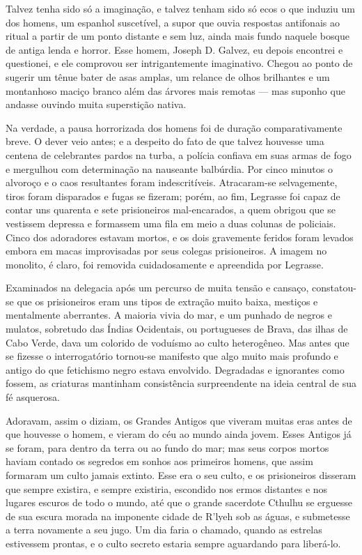 \begin{pages}
\begin{Rightside}
Talvez tenha sido só a imaginação, e talvez tenham sido só ecos o que
induziu um dos homens, um espanhol suscetível, a supor que ouvia
respostas antifonais ao ritual a partir de um ponto distante e sem luz,
ainda mais fundo naquele bosque de antiga lenda e horror. Esse homem,
Joseph D. Galvez, eu depois encontrei e questionei, e ele comprovou ser
intrigantemente imaginativo. Chegou ao ponto de sugerir um tênue bater
de asas amplas, um relance de olhos brilhantes e um montanhoso maciço
branco além das árvores mais remotas --- mas suponho que andasse ouvindo
muita superstição nativa.

Na verdade, a pausa horrorizada dos homens foi de duração
comparativamente breve. O dever veio antes; e a despeito do fato de que
talvez houvesse uma centena de celebrantes pardos na turba, a polícia
confiava em suas armas de fogo e mergulhou com determinação na nauseante
balbúrdia. Por cinco minutos o alvoroço e o caos resultantes foram
indescritíveis. Atracaram-se selvagemente, tiros foram disparados e
fugas se fizeram; porém, ao fim, Legrasse foi capaz de contar uns
quarenta e sete prisioneiros mal-encarados, a quem obrigou que se
vestissem depressa e formassem uma fila em meio a duas colunas de
policiais. Cinco dos adoradores estavam mortos, e os dois gravemente
feridos foram levados embora em macas improvisadas por seus colegas
prisioneiros. A imagem no monolito, é claro, foi removida cuidadosamente
e apreendida por Legrasse.

Examinados na delegacia após um percurso de muita tensão e cansaço,
constatou-se que os prisioneiros eram uns tipos de extração muito baixa,
mestiços e mentalmente aberrantes. A maioria vivia do mar, e um punhado
de negros e mulatos, sobretudo das Índias Ocidentais, ou portugueses de
Brava, das ilhas de Cabo Verde, dava um colorido de voduísmo ao culto
heterogêneo. Mas antes que se fizesse o interrogatório tornou-se
manifesto que algo muito mais profundo e antigo do que fetichismo negro
estava envolvido. Degradadas e ignorantes como fossem, as criaturas
mantinham consistência surpreendente na ideia central de sua fé
asquerosa.

Adoravam, assim o diziam, os Grandes Antigos que viveram muitas eras
antes de que houvesse o homem, e vieram do céu ao mundo ainda jovem.
Esses Antigos já se foram, para dentro da terra ou ao fundo do mar; mas
seus corpos mortos haviam contado os segredos em sonhos aos primeiros
homens, que assim formaram um culto jamais extinto. Esse era o seu
culto, e os prisioneiros disseram que sempre existira, e sempre
existiria, escondido nos ermos distantes e nos lugares escuros de todo o
mundo, até que o grande sacerdote Cthulhu se erguesse de sua escura
morada na imponente cidade de R'lyeh sob as águas, e submetesse a terra
novamente a seu jugo. Um dia faria o chamado, quando as estrelas
estivessem prontas, e o culto secreto estaria sempre aguardando para
liberá-lo.


\end{Rightside}
\end{pages}
